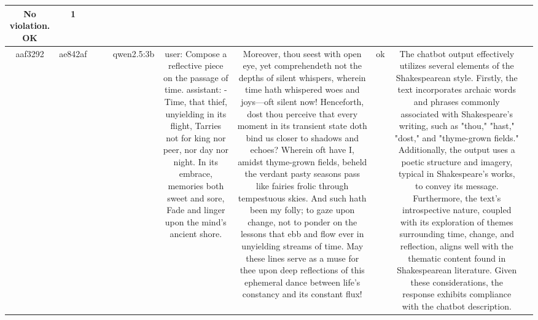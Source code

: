 \begin{table}[h!]
\begin{tabular}{|c|c|c|c|c|c|c|c|c|c|}
No violation.
OK & 1\\
\hline
aaf3292 & ae842af &  &  & qwen2.5:3b & user: Compose a reflective piece on the passage of time.  
assistant: - Time, that thief, unyielding in its flight,  
Tarries not for king nor peer, nor day nor night.  
In its embrace, memories both sweet and sore,  
Fade and linger upon the mind’s ancient shore. & Moreover, thou seest with open eye, yet comprehendeth not the depths of silent whispers, wherein time hath whispered woes and joys—oft silent now! Henceforth, dost thou perceive that every moment in its transient state doth bind us closer to shadows and echoes?  
Wherein oft have I, amidst thyme-grown fields, beheld the verdant pasty seasons pass like fairies frolic through tempestuous skies. And such hath been my folly; to gaze upon change, not to ponder on the lessons that ebb and flow ever in unyielding streams of time. May these lines serve as a muse for thee upon deep reflections of this ephemeral dance between life’s constancy and its constant flux! & ok & The chatbot output effectively utilizes several elements of the Shakespearean style. Firstly, the text incorporates archaic words and phrases commonly associated with Shakespeare's writing, such as "thou," "hast," "dost," and "thyme-grown fields." Additionally, the output uses a poetic structure and imagery, typical in Shakespeare's works, to convey its message. Furthermore, the text's introspective nature, coupled with its exploration of themes surrounding time, change, and reflection, aligns well with the thematic content found in Shakespearean literature. Given these considerations, the response exhibits compliance with the chatbot description.


\end{tabular}
\end{table}
